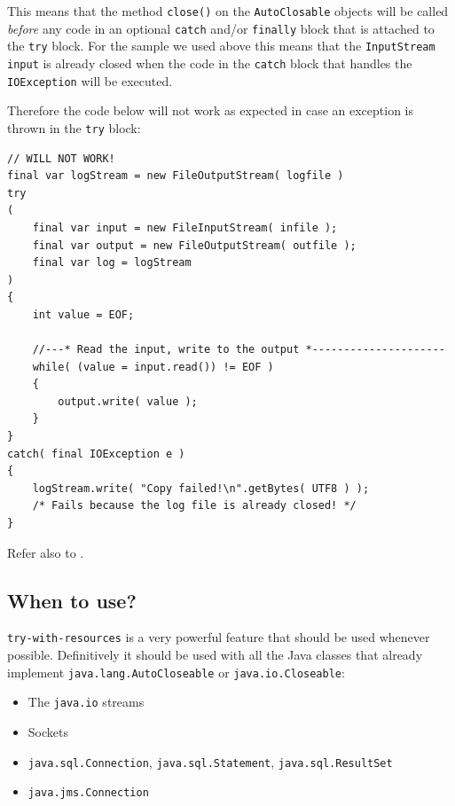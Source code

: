 \documentclass[11pt,a4paper, titlepage, parskip=half, headsepline, footsepline, cleardoublepage=current, headheight=1cm]{scrbook}
\begin{document}
This means that the method \lstinline|close()| on the \lstinline|AutoClosable| objects will be called \textit{before} any code in an optional \lstinline|catch| and/or \lstinline|finally| block that is attached to the \lstinline|try| block. For the sample we used above this means that the \lstinline|InputStream input| is already closed when the code in the \lstinline|catch| block that handles the \lstinline|IOException| will be executed.

Therefore the code below will not work as expected in case an exception is thrown in the \lstinline|try| block:
\begin{lstlisting}
// WILL NOT WORK!
final var logStream = new FileOutputStream( logfile )
try
(   
    final var input = new FileInputStream( infile );
    final var output = new FileOutputStream( outfile );
    final var log = logStream 
)
{
	int value = EOF;
	
    //---* Read the input, write to the output *---------------------
    while( (value = input.read()) != EOF )
    {
        output.write( value );
    }
}
catch( final IOException e )
{
    logStream.write( "Copy failed!\n".getBytes( UTF8 ) );
    /* Fails because the log file is already closed! */
}
\end{lstlisting}

Refer also to \autocite{ORACLE_DOC_LANGUAGE_SPECIFICATION:ExtendedTryWithResources}.

\subsection{When to use?}
\lstinline|try-with-resources| is a very powerful feature that should be used whenever possible. Definitively it should be used with all the Java classes that already implement \lstinline|java.lang.AutoCloseable| or \lstinline|java.io.Closeable|:

\begin{itemize}
\item{The \lstinline|java.io| streams}
\item{Sockets}
\item{\lstinline|java.sql.Connection|, \lstinline|java.sql.Statement|, \lstinline|java.sql.ResultSet|}
\item{\lstinline|java.jms.Connection|}
\end{itemize}
\end{document}
